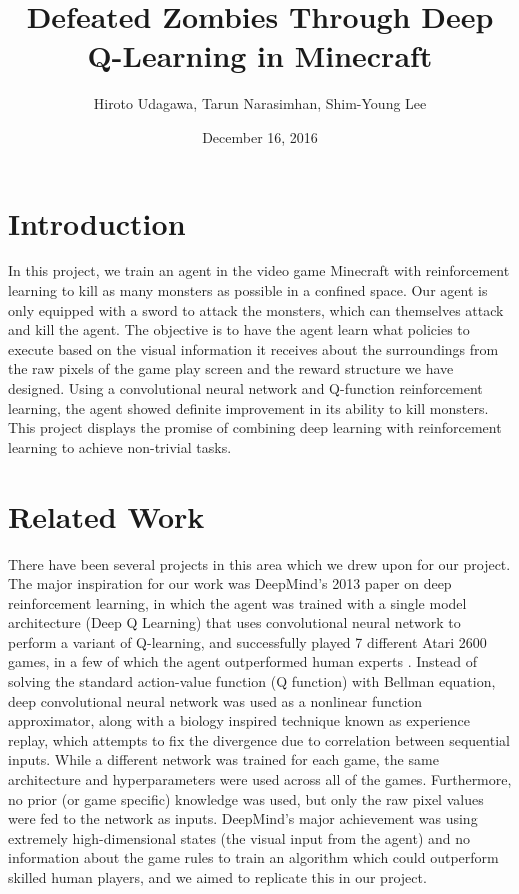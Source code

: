 \documentclass{article}
\title{Defeated Zombies Through Deep Q-Learning in Minecraft}
\author{Hiroto Udagawa, Tarun Narasimhan, Shim-Young Lee}
\date{December 16, 2016}
\begin{document}
\maketitle

\begin{multicols}{2}

\section{Introduction}

In this project, we train an agent in the video game Minecraft with reinforcement learning to kill as many monsters as possible in a confined space. Our agent is only equipped with a sword to attack the monsters,  which can themselves attack and kill the agent.
The objective is to have the agent learn what policies to execute based on the visual information it receives about the surroundings from the raw pixels of the game play screen and the reward structure we have designed.
Using a convolutional neural network and Q-function reinforcement learning, the agent showed definite improvement in its ability to kill monsters.
This project displays the promise of combining deep learning with reinforcement learning to achieve non-trivial tasks.






\section{Related Work}

There have been several projects in this area which we drew upon for our project.
The major inspiration for our work was DeepMind's 2013 paper on deep reinforcement learning, in which the agent was trained with a single model architecture (Deep Q Learning) that uses convolutional neural network to perform a variant of Q-learning, and successfully played 7 different Atari 2600 games, in a few of which the agent outperformed human experts \cite{deepMind}.
Instead of solving the standard action-value function (Q function) with Bellman equation, deep convolutional neural network was used as a nonlinear function approximator, along with a biology inspired technique known as experience replay, which attempts to fix the divergence due to correlation between sequential inputs.
While a different network was trained for each game, the same architecture and hyperparameters were used across all of the games.
Furthermore, no prior (or game specific) knowledge was used, but only the raw pixel values were fed to the network as inputs.
DeepMind's major achievement was using extremely high-dimensional states (the visual input from the agent) and no information about the game rules to train an algorithm which could outperform skilled human players, and we aimed to replicate this in our project.


\end{multicols}
\end{document}
